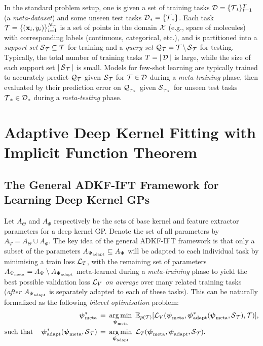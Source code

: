 In the standard problem setup, one is given a set of training tasks $\dataset=\{\task_t\}_{t=1}^T$ (a \emph{meta-dataset})
and some unseen test tasks $\dataset_*=\{\task_*\}$.
Each task $\task=\{(\bfx_i, y_i)\}_{i=1}^{N_{\task}}$ is a set of points
in the domain $\domainx$ (e.g., space of molecules) with corresponding labels (continuous, categorical, etc.),
and is partitioned into a \emph{support set} $\support_{\task}\subseteq \task$ for training
and a \emph{query set} $\query_{\task}=\task \setminus \support_{\task}$ for testing.
Typically, the total number of training tasks $T=|\dataset|$ is large,
while the size of each support set $|\support_{\task}|$ is small.
Models for few-shot learning are typically trained to accurately predict $\query_{\task}$
given $\support_{\task}$
for $\task\in\dataset$ during a \emph{meta-training} phase,
then evaluated by their prediction error on $\query_{_{\task_*}}$ given $\support_{_{\task_*}}$
for unseen test tasks $\task_*\in\dataset_*$
during a \emph{meta-testing} phase.
        
\section{Adaptive Deep Kernel Fitting with Implicit Function Theorem}\label{sec:method}
    
    \subsection{The General ADKF-IFT Framework for Learning 
    Deep Kernel GPs}\label{ssec:general-ADKF-IFT}
    Let $A_{\Theta}$ and $A_{\Phi}$ respectively be the sets of base kernel and feature extractor parameters for a deep kernel GP.
    Denote the set of all parameters by $A_{\Psi} = A_{\Theta}\cup A_{\Phi}$.
    The key idea of the general ADKF-IFT framework is that only a subset of the parameters 
    ${\color{black}A_{\Psiml}}\subseteq A_{\Psi}$ will be {\color{black}adapted} to each individual task by minimising a train loss $\loss_T$,
    with the remaining set of parameters ${\color{black}A_{\Psimeta}}=A_{\Psi} \setminus {\color{black}A_{\Psiml}}$
    {\color{black}meta-learned} during a {\color{black}\emph{meta-training}} phase to yield the best possible validation loss $\loss_V$ \emph{on average} over many related training tasks (\emph{after} $A_{\Psiml}$ is separately adapted to each of these tasks).
    This can be naturally formalized as the following \emph{bilevel optimisation} problem:
    \begin{align}
        \psimeta^*\,=\,\,&\argmin_{\psimeta}~\mean_{p(\task)}[\loss_V(\psimeta, \psiml^*(\psimeta,\support_{\task} ),\task )],\label{eq:outer_loss}\\
        \mathrm{such\ that}\quad \psiml^*(\psimeta,\support_{\task} )\,=\,\,&\argmin_{\psiml}~\loss_T(\psimeta,\psiml,\support_{\task} ).\label{eq:inner_loss}
    \end{align}
    
